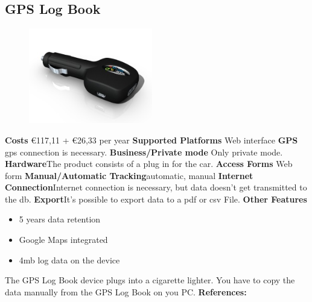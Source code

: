 \begin{singlespace}
\section{GPS Log Book}
\begin{figure}
  \begin{center}
    \includegraphics[width=0.48\textwidth]{bilder/GPSlogbook2}
  \end{center}
\end{figure}
\textbf{Costs} \euro 117,11 + \euro 26,33 per year
\newline\newline
\textbf{Supported Platforms} Web interface
\newline\newline
\textbf{GPS} \gls{gps} connection is necessary.
\newline\newline
\textbf{Business/Private mode} Only private mode.
\newline\newline
\textbf{Hardware}The product consists of a plug in for the car.
\newline\newline
\textbf{Access Forms} Web form
\newline\newline
\textbf{Manual/Automatic Tracking}automatic, manual
\newline\newline
\textbf{Internet Connection}Internet connection is necessary, but data doesn't get transmitted to the \gls{db}.
\newline\newline
\textbf{Export}It's possible to export data to a \gls{pdf} or \gls{csv} File.
\newline\newline
\textbf{Other Features}
\begin{itemize}
\item 5 years data retention 
\item Google Maps integrated
\item 4\gls{mb} log data on the device
\end{itemize}
The GPS Log Book device plugs into a cigarette lighter. You have to copy the data manually from the GPS Log Book on you PC.
\newline\newline
\textbf{References:} \cite{GPS_Log_Book}
\newpage
\clearpageauthor

\end{singlespace}
